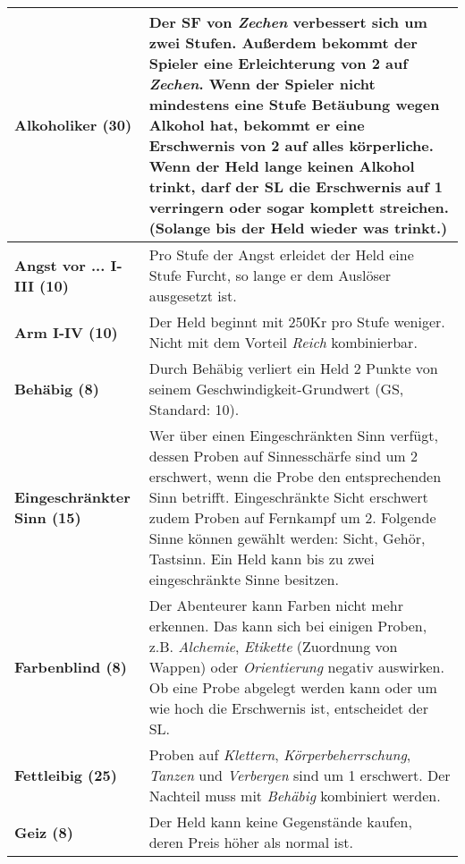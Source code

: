 \begin{longtable}{|p{5cm}|p{11cm}|}
\hline

\textbf{Alkoholiker (30)} & Der SF von \textit{Zechen} verbessert sich um zwei Stufen. Außerdem bekommt der Spieler eine Erleichterung von 2 auf \textit{Zechen}. Wenn der Spieler nicht mindestens eine Stufe Betäubung wegen Alkohol hat, bekommt er eine Erschwernis von 2 auf alles körperliche. Wenn der Held lange keinen Alkohol trinkt, darf der SL die Erschwernis auf 1 verringern oder sogar komplett streichen. (Solange bis der Held wieder was trinkt.) \\ \hline

\textbf{Angst vor ... I-III (10)} & Pro Stufe der Angst erleidet der Held eine Stufe Furcht, so lange er dem Auslöser ausgesetzt ist. \\ \hline

\textbf{Arm I-IV (10)} & Der Held beginnt mit 250Kr pro Stufe weniger. Nicht mit dem Vorteil \textit{Reich} kombinierbar. \\ \hline

\textbf{Behäbig (8)} & Durch Behäbig verliert ein Held 2 Punkte von seinem Geschwindigkeit-Grundwert (GS, Standard: 10). \\ \hline

\textbf{Eingeschränkter Sinn (15)} & Wer über einen Eingeschränkten Sinn verfügt, dessen Proben auf Sinnesschärfe sind um 2 erschwert, wenn die Probe den entsprechenden Sinn betrifft. Eingeschränkte Sicht erschwert zudem Proben auf Fernkampf um 2. Folgende Sinne können gewählt werden: Sicht, Gehör, Tastsinn. Ein Held kann bis zu zwei eingeschränkte Sinne besitzen. \\ \hline

\textbf{Farbenblind (8)} & Der Abenteurer kann Farben nicht mehr erkennen. Das kann sich bei einigen Proben, z.B. \textit{Alchemie}, \textit{Etikette} (Zuordnung von Wappen) oder \textit{Orientierung} negativ auswirken. Ob eine Probe abgelegt werden kann oder um wie hoch die Erschwernis ist, entscheidet der SL. \\ \hline

\textbf{Fettleibig (25)} & Proben auf \textit{Klettern}, \textit{Körperbeherrschung}, \textit{Tanzen} und \textit{Verbergen} sind um 1 erschwert. Der Nachteil muss mit \textit{Behäbig} kombiniert werden. \\ \hline

\textbf{Geiz (8)} & Der Held kann keine Gegenstände kaufen, deren Preis höher als normal ist. \\ \hline


\end{longtable}
